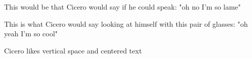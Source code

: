 \documentclass[12pt]{article}
\begin{document}
\begin{minipage}[t]{0.45\textwidth}
    This would be that Cicero would say if he could speak: "oh no I'm so lame"
\end{minipage}\hfill
\begin{minipage}[t]{0.45\textwidth}
    This is what Cicero would say looking at himself with this pair of glasses: "oh yeah I'm so cool"
\end{minipage}

\vspace{50px}

\begin{center}
    Cicero likes vertical space and centered text
\end{center}
\end{document}
